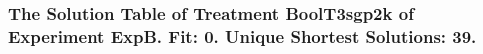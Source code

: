  \begin{frame}
 \fontsize{8pt}{9pt}\selectfont
 \frametitle{ The Solution Table of Treatment BoolT3sgp2k of Experiment ExpB. Fit: 0. Unique Shortest Solutions: 39. }

 \label{ExpBSolutionTable015.tex}  
 \end{frame}

